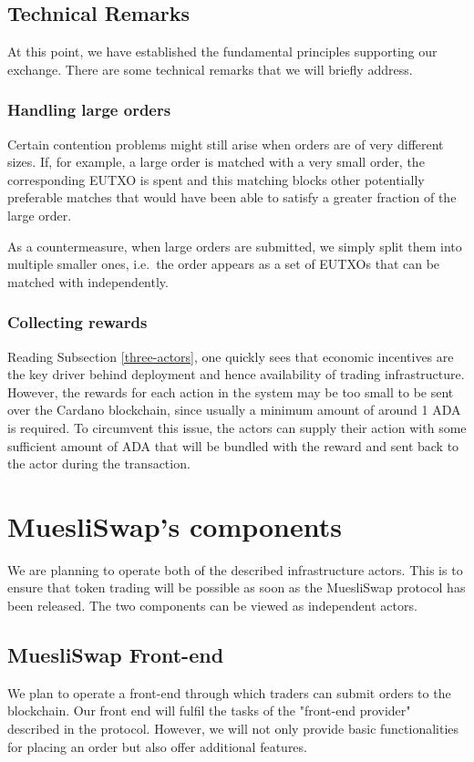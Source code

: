 \documentclass[11pt]{article}
\begin{document}
\subsection{Technical Remarks}

At this point, we have established the fundamental principles supporting our exchange. There are some technical remarks that we will briefly address.

\subsubsection{Handling large orders}

Certain contention problems might still arise when orders are of very different sizes. If, for example, a large order is matched with a very small order, the corresponding EUTXO is spent and this matching blocks other potentially preferable matches that would have been able to satisfy a greater fraction of the large order.

As a countermeasure, when large orders are submitted, we simply split them into multiple smaller ones, i.e.\ the order appears as a set of EUTXOs that can be matched with independently.

\subsubsection{Collecting rewards}

Reading Subsection \ref{three-actors}, one quickly sees that economic incentives are the key driver behind deployment and hence availability of trading infrastructure.
However, the rewards for each action in the system may be too small to be sent over the Cardano blockchain, since usually a minimum amount of around 1 ADA is required. \cite{min-ada}
To circumvent this issue, the actors can supply their action with some sufficient amount of ADA that will be bundled with the reward and sent back to the actor during the transaction.


\section{MuesliSwap's components}

We are planning to operate both of the described infrastructure actors. This is to ensure that token trading will be possible as soon as the MuesliSwap protocol has been released. The two components can be viewed as independent actors.

\subsection{MuesliSwap Front-end}
We plan to operate a front-end through which traders can submit orders to the blockchain. Our front end will fulfil the tasks of the "front-end provider" described in the protocol. However, we will not only provide basic functionalities for placing an order but also offer additional features.
\end{document}
